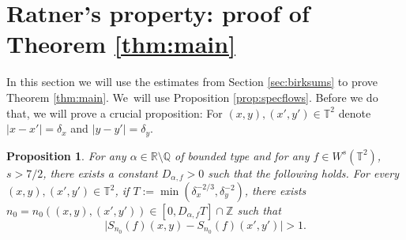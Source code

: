 \documentclass[10pt]{amsart}
\theoremstyle{definition}
\theoremstyle{plain}
\newtheorem{proposition}[definition]{Proposition}
\newcommand\QQ{\mathbb{Q}}
\newcommand\RR{\mathbb{R}}
\newcommand\TT{\mathbb{T}}
\newcommand\ZZ{\mathbb{Z}}
\begin{document}
\section{Ratner's property: proof of Theorem \ref{thm:main}}\label{sec:proof}
In this section we will use the estimates from Section \ref{sec:birksums} to prove Theorem \ref{thm:main}. We~will use Proposition \ref{prop:specflows}. Before we do that, we will prove a crucial proposition:
For $(x,y),(x',y')\in \TT^2$ denote $\vert x-x'\vert =\delta_x$ and $\vert y-y'\vert =\delta_y$.
\begin{proposition}\label{prop:split} For any $\alpha\in \RR\setminus \QQ$ of bounded type and for any $f\in W^s(\TT^2)$, $s>7/2$, there exists a constant $D_{\alpha,f}>0$ such that the following holds. For every $(x,y),(x',y')\in \TT^2$, if $T:=\min(\delta_x^{-2/3}, \delta_y^{-2})$, there exists $n_0=n_0((x,y),(x',y'))\in [0,D_{\alpha,f}T]\cap \ZZ$ such that
\begin{equation}\label{eq:drift}
\bigl|S_{n_0}(f)(x,y)-S_{n_0}(f)(x',y')\bigr|>1.
\end{equation}
\end{proposition}
\end{document}

